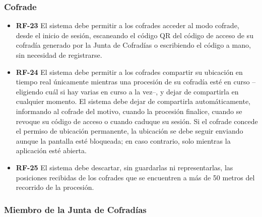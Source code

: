 \subsubsection{Cofrade}

\begin{itemize}
    \item \textbf{RF-23}  El sistema debe permitir a los cofrades acceder al modo cofrade, desde el inicio de sesión, escaneando el código QR del código de acceso de su cofradía generado por la Junta de Cofradías o escribiendo el código a mano, sin necesidad de registrarse.

    \item \textbf{RF-24}  El sistema debe permitir a los cofrades compartir su ubicación en tiempo real únicamente mientras una procesión de su cofradía esté en curso --eligiendo cuál si hay varias en curso a la vez--, y dejar de compartirla en cualquier momento. El sistema debe dejar de compartirla automáticamente, informando al cofrade del motivo, cuando la procesión finalice, cuando se revoque su código de acceso o cuando caduque su sesión. Si el cofrade concede el permiso de ubicación permanente, la ubicación se debe seguir enviando aunque la pantalla esté bloqueada; en caso contrario, solo mientras la aplicación esté abierta.

    \item \textbf{RF-25}  El sistema debe descartar, sin guardarlas ni representarlas, las posiciones recibidas de los cofrades que se encuentren a más de 50 metros del recorrido de la procesión.
\end{itemize}

\subsubsection{Miembro de la Junta de Cofradías}

